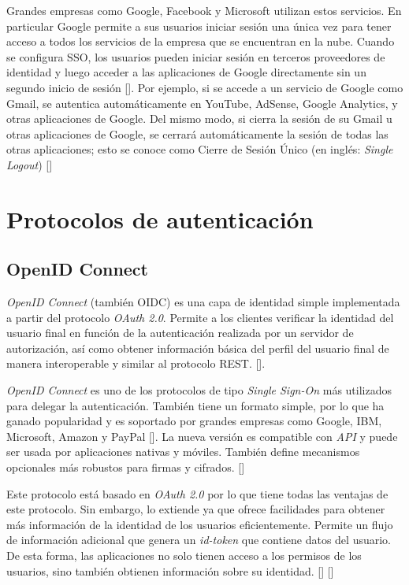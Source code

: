 Grandes empresas como Google, Facebook y Microsoft utilizan estos servicios. En particular Google permite a sus usuarios iniciar sesión una única vez para tener acceso a todos los servicios de la empresa que se encuentran en la nube. Cuando se configura SSO, los usuarios pueden iniciar sesión en terceros proveedores de identidad y luego acceder a las aplicaciones de Google directamente sin un segundo inicio de sesión [\cite{google-support}]. Por ejemplo, si se accede a un servicio de Google como Gmail, se autentica automáticamente en YouTube, AdSense, Google Analytics, y otras aplicaciones de Google. Del mismo modo, si cierra la sesión de su Gmail u otras aplicaciones de Google, se cerrará automáticamente la sesión de todas las otras aplicaciones; esto se conoce como Cierre de Sesión Único (en inglés: \textit{Single Logout}) [\cite{sso-doc}]

\section{Protocolos de autenticación} \label{protocols}

\subsection{OpenID Connect}
\textit{OpenID Connect}  (también OIDC) es una capa de identidad simple implementada a partir del protocolo \textit{OAuth 2.0}. Permite a los clientes verificar la identidad del usuario final en función de la autenticación realizada por un servidor de autorización, así como obtener información básica del perfil del usuario final de manera interoperable y similar al protocolo REST. [\cite{openid-doc}]. 

\textit{OpenID Connect }es uno de los protocolos de tipo \textit{Single Sign-On} más utilizados para delegar la autenticación. También tiene un formato simple, por lo que ha ganado popularidad y es soportado por grandes empresas como Google, IBM, Microsoft, Amazon y PayPal [\cite{mainka2017sok}]. La nueva versión es compatible con \textit{API} y puede ser usada por aplicaciones nativas y móviles. También define mecanismos opcionales más robustos para firmas y cifrados. [\cite{openid-doc}]

Este protocolo está basado en \textit{OAuth 2.0} por lo que tiene todas las ventajas de este protocolo. Sin embargo, lo extiende ya que ofrece facilidades para obtener más información de la identidad de los usuarios eficientemente. Permite un flujo de información adicional que genera un \textit{id-token} que contiene datos del usuario. De esta forma, las aplicaciones no solo tienen acceso a los permisos de los usuarios, sino también obtienen información sobre su identidad.  [\cite{openid-doc}] [\cite{kutera2016single}]

